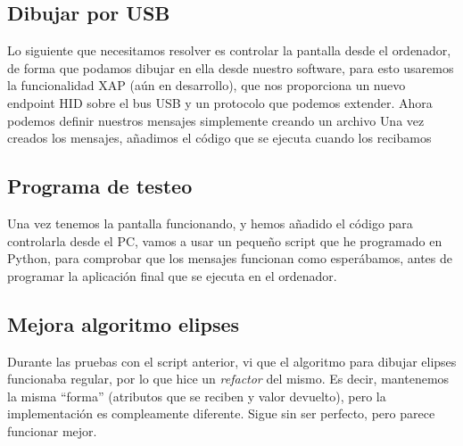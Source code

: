 \subsection{Dibujar por USB} \label{section:dibujar-usb}
Lo siguiente que necesitamos resolver es controlar la pantalla desde el ordenador, de forma que podamos dibujar en ella desde nuestro software, para esto usaremos la funcionalidad XAP\cite{xap} (aún en desarrollo), que nos proporciona un nuevo endpoint HID\cite{hid} sobre el bus USB\cite{USB} y un protocolo\cite{xap-specs} que podemos extender. \newline
Ahora podemos definir nuestros mensajes simplemente creando un archivo \cite{xap-custom-msg} \newline
Una vez creados los mensajes, añadimos el código\cite{qp-xap-handler} que se ejecuta cuando los recibamos

\subsection{Programa de testeo}
Una vez tenemos la pantalla funcionando, y hemos añadido el código para controlarla desde el PC, vamos a usar un pequeño script\cite{qp-xap-test} que he programado en Python, para comprobar que los mensajes funcionan como esperábamos, antes de programar la aplicación final que se ejecuta en el ordenador.

\subsection{Mejora algoritmo elipses}
Durante las pruebas con el script anterior, vi que el algoritmo para dibujar elipses funcionaba regular, por lo que hice un \textit{refactor} del mismo. Es decir, mantenemos la misma ``forma'' (atributos que se reciben y valor devuelto), pero la implementación\cite{ellipse-pr} es compleamente diferente. Sigue sin ser perfecto, pero parece funcionar mejor.

